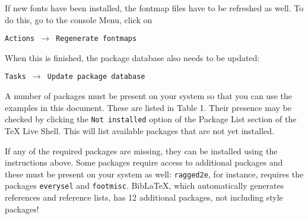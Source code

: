 \documentclass[12pt, a4paper]{article}
\begin{document}
If new fonts have been installed, the fontmap files have to be refreshed as well. To do this, go to the console Menu, click on 


\begin{flushleft}
\texttt{Actions $\rightarrow$ Regenerate fontmaps}
\end{flushleft}


\begin{flushleft}
When this is finished, the package database also needs to be updated: 
\end{flushleft}


\begin{flushleft}
\texttt{Tasks $\rightarrow$ Update package database}
\end{flushleft}


A number of packages must be present on your system so that you can use the examples in this document. These are listed in Table 1. Their presence may be checked by clicking the \texttt{Not installed} option of the Package List section of the TeX Live Shell. This will list available packages that are not yet installed. 

If any of the required packages are missing, they can be installed using the instructions above. Some packages require access to additional packages and these must be present on your system as well: \texttt{ragged2e}, for instance, requires the packages \texttt{everysel} and \texttt{footmisc}. BibLaTeX, which automatically generates references and reference lists, has 12 additional packages, not including style packages!
\end{document}
